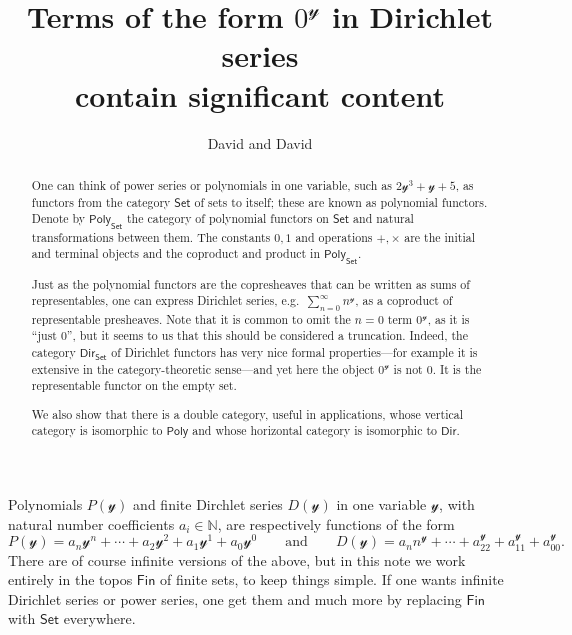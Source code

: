 \documentclass[11pt, article, one side]{memoir}
\theoremstyle{theorem}
\theoremstyle{definition}
\theoremstyle{remark}
\newcommand{\cat}[1]{\mathcal{#1}}%
\newcommand{\Cat}[1]{\mathsf{#1}}%
\newcommand{\nn}{\mathbb{N}}
\newcommand{\smset}{\Cat{Set}}
\newcommand{\finset}{\Cat{Fin}}
\newcommand{\yon}{\mathcal{y}}
\newcommand{\poly}{\Cat{Poly}}
\newcommand{\dir}{\Cat{Dir}}
\newcommand{\qqand}{\qquad\text{and}\qquad}
\begin{document}
\title{Terms of the form $0^\yon$ in Dirichlet series\\contain significant content}

\author{David and David}

\maketitle
\begin{abstract}
One can think of power series or polynomials in one variable, such as $2\yon^3+\yon+5$, as functors from the category $\smset$ of sets to itself; these are known as polynomial functors. Denote by $\poly_\smset$ the category of polynomial functors on $\smset$ and natural transformations between them. The constants $0,1$ and operations $+,\times$ are the initial and terminal objects and the coproduct and product in $\poly_\smset$. 

Just as the polynomial functors are the copresheaves that can be written as sums of representables, one can express Dirichlet series, e.g.\ $\sum_{n=0}^\infty n^\yon$, as a coproduct of representable presheaves. Note that it is common to omit the $n=0$ term $0^\yon$, as it is ``just 0'', but it seems to us that this should be considered a truncation. Indeed, the category $\dir_\smset$ of Dirichlet functors has very nice formal properties---for example it is extensive in the category-theoretic sense---and yet here the object $0^\yon$ is not $0$. It is the representable functor on the empty set.

We also show that there is a double category, useful in applications, whose vertical category is isomorphic to $\poly$ and whose horizontal category is isomorphic to $\dir$.
\end{abstract}

Polynomials $P(\yon)$ and finite Dirchlet series $D(\yon)$ in one variable $\cat{y}$, with natural number coefficients $a_i\in\nn$, are respectively functions of the form
\[
  P(\yon)=a_n\yon^n+\cdots+a_2\yon^2+a_1\yon^1+a_0\yon^0
  \qqand
  D(\yon)=a_nn^\yon+\cdots+a_22^\yon+a_11^\yon+a_00^\yon.
\]
There are of course infinite versions of the above, but in this note we work entirely in the topos $\finset$ of finite sets, to keep things simple. If one wants infinite Dirichlet series or power series, one get them and much more by replacing $\finset$ with $\smset$ everywhere.
\end{document}
